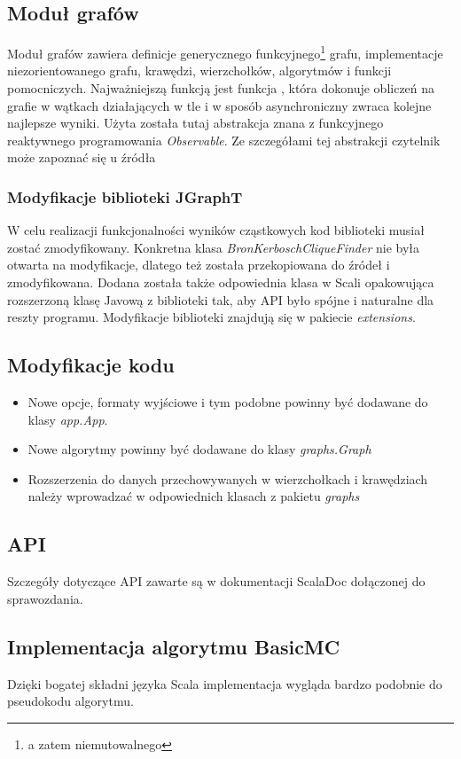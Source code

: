 \documentclass[12pt, a4paper]{article}
\begin{document}
\subsection{Moduł grafów}
Moduł grafów zawiera definicje generycznego funkcyjnego\footnote{a zatem niemutowalnego} grafu, implementacje niezorientowanego grafu, krawędzi, wierzchołków, algorytmów i funkcji pomocniczych. Najważniejszą funkcją jest funkcja , która dokonuje obliczeń na grafie w wątkach działających w tle i w sposób asynchroniczny zwraca kolejne najlepsze wyniki. Użyta została tutaj abstrakcja znana z funkcyjnego reaktywnego programowania \emph{Observable}. Ze szczegółami tej abstrakcji czytelnik może zapoznać się u źródła \cite{rx}

\subsubsection{Modyfikacje biblioteki JGraphT}
W celu realizacji funkcjonalności wyników cząstkowych kod biblioteki musiał zostać zmodyfikowany. Konkretna klasa \emph{BronKerboschCliqueFinder} nie była otwarta na modyfikacje, dlatego też została przekopiowana do źródeł i zmodyfikowana. Dodana została także odpowiednia klasa w Scali opakowująca rozszerzoną klasę Javową z biblioteki tak, aby API było spójne i naturalne dla reszty programu.
Modyfikacje biblioteki znajdują się w pakiecie \emph{extensions}.

\subsection{Modyfikacje kodu}
\begin{itemize}
\item Nowe opcje, formaty wyjściowe i tym podobne powinny być dodawane do klasy \emph{app.App}.
\item Nowe algorytmy powinny być dodawane do klasy \emph{graphs.Graph}
\item Rozszerzenia do danych przechowywanych w wierzchołkach i krawędziach należy wprowadzać w odpowiednich klasach z pakietu \emph{graphs}
\end{itemize}

\subsection{API}
Szczegóły dotyczące API zawarte są w dokumentacji ScalaDoc dołączonej do sprawozdania.


\subsection{Implementacja algorytmu BasicMC}
Dzięki bogatej składni języka Scala implementacja wygląda bardzo podobnie do pseudokodu algorytmu.
\end{document}
